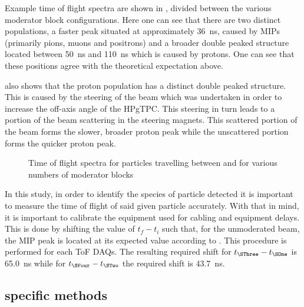 Example time of flight spectra are shown in , divided between the various moderator block configurations.
Here one can see that there are two distinct populations, a faster peak situated at approximately \SI{36}{\nano\second}, caused by MIPs (primarily pions, muons and positrons) and a broader double peaked structure located between \SI{50}{\nano\second} and \SI{110}{\nano\second} which is caused by protons.
One can see that these positions agree with the theoretical expectation above.

 also shows that the proton population has a distinct double peaked structure.
This is caused by the steering of the beam which was undertaken in order to increase the off-axis angle of the HPgTPC.
This steering in turn leads to a portion of the beam scattering in the steering magnets.
This scattered portion of the beam forms the slower, broader proton peak while the unscattered portion forms the quicker proton peak.

\begin{figure}[h]
  \begin{adjustbox}{max totalsize={.8\linewidth}, center}
    
  \end{adjustbox}
  \caption[Time of flight spectra for particles travelling between \SOne and \SThree for various numbers of moderator blocks]{Time of flight spectra for particles travelling between \SOne and \SThree for various numbers of moderator blocks}
  \label{fig:s3Tof}
\end{figure}

In this study, in order to identify the species of particle detected it is important to measure the time of flight of said given particle accurately.
With that in mind, it is important to calibrate the equipment used for cabling and equipment delays.
This is done by shifting the value of $t_{f}-t_{i}$ such that, for the unmoderated beam, the MIP peak is located at its expected value according to .
This procedure is performed for each ToF DAQs.
The resulting required shift for $t_{\SThree} - t_{\SOne}$ is \SI{65.0}{\nano\second} while for $t_{\SFour} - t_{\STwo}$ the required shift is \SI{43.7}{\nano\second}.

\subsection{\SThree specific methods}
\label{sec:hptpc_beam_flux:methods:s3}



